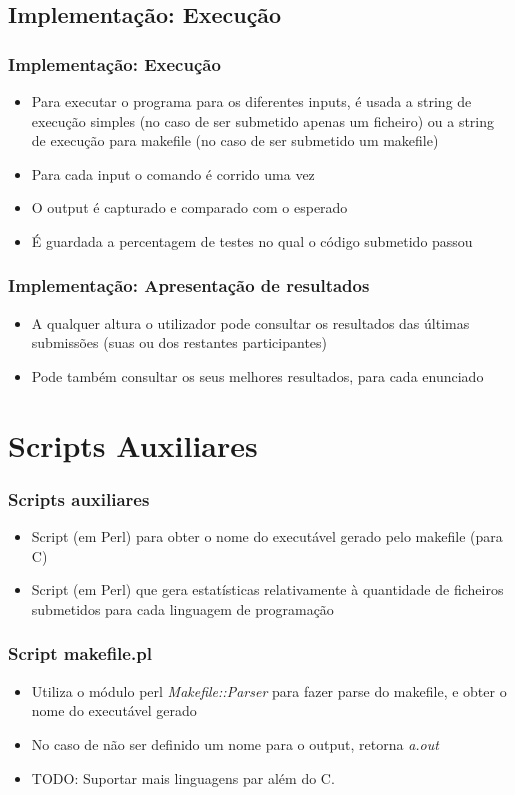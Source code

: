 \documentclass{beamer}
\begin{document}
\subsection{Implementação: Execução}
\begin{frame} \frametitle{Implementação: Execução}
\begin{itemize}
\item Para executar o programa para os diferentes inputs, é usada a string de execução simples (no caso de ser submetido
apenas um ficheiro) ou a string de execução para makefile (no caso de ser submetido um makefile)
\item Para cada input o comando é corrido uma vez
\item O output é capturado e comparado com o esperado
\item É guardada a percentagem de testes no qual o código submetido passou
\end{itemize}
\end{frame}

\begin{frame} \frametitle{Implementação: Apresentação de resultados}
\begin{itemize}
\item A qualquer altura o utilizador pode consultar os resultados das últimas submissões (suas ou dos restantes 
participantes)
\item Pode também consultar os seus melhores resultados, para cada enunciado
\end{itemize}
\end{frame}

\section{Scripts Auxiliares}
\begin{frame} \frametitle{Scripts auxiliares}
\begin{itemize} 
\item Script (em Perl) para obter o nome do executável gerado pelo makefile (para C)
\item Script (em Perl) que gera estatísticas relativamente à quantidade de ficheiros submetidos para cada linguagem de programação
\end{itemize}
\end{frame}

\begin{frame} \frametitle{Script makefile.pl}
\begin{itemize} 
\item Utiliza o módulo perl \textit{Makefile::Parser} para fazer parse do makefile, e obter o nome do executável gerado
\item No caso de não ser definido um nome para o output, retorna \textit{a.out}
\item TODO: Suportar mais linguagens par além do C.
\end{itemize}
\end{frame}
\end{document}
